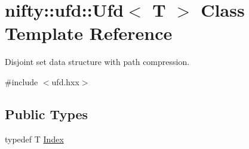 \hypertarget{classnifty_1_1ufd_1_1Ufd}{}\section{nifty\+:\+:ufd\+:\+:Ufd$<$ T $>$ Class Template Reference}
\label{classnifty_1_1ufd_1_1Ufd}


Disjoint set data structure with path compression.  




{\ttfamily \#include $<$ufd.\+hxx$>$}

\subsection*{Public Types}
\begin{DoxyCompactItemize}
\item 
typedef T \hyperlink{classnifty_1_1ufd_1_1Ufd_a0a9a7ab02b6d77fb2035234cbda8b3a7}{Index}
\end{DoxyCompactItemize}
